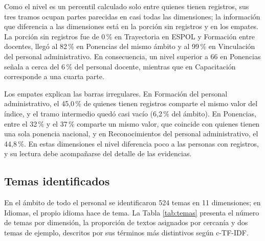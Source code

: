 Como el nivel es un percentil calculado solo entre quienes tienen registros, sus tres tramos ocupan partes parecidas en casi todas las dimensiones; la información que diferencia a las dimensiones está en la porción sin registros y en los empates. La porción sin registros fue de 0\,\% en Trayectoria en ESPOL y Formación entre docentes, llegó al 82\,\% en Ponencias del mismo ámbito y al 99\,\% en Vinculación del personal administrativo. En consecuencia, un nivel superior a 66 en Ponencias señala a cerca del 6\,\% del personal docente, mientras que en Capacitación corresponde a una cuarta parte.

Los empates explican las barras irregulares. En Formación del personal administrativo, el 45,0\,\% de quienes tienen registros comparte el mismo valor del índice, y el tramo intermedio quedó casi vacío (6,2\,\% del ámbito). En Ponencias, entre el 32\,\% y el 37\,\% comparte un mismo valor, que coincide con quienes tienen una sola ponencia nacional, y en Reconocimientos del personal administrativo, el 44,8\,\%. En estas dimensiones el nivel diferencia poco a las personas con registros, y su lectura debe acompañarse del detalle de las evidencias.

\subsection{Temas identificados}
\label{sec:res_temas}

En el ámbito de todo el personal se identificaron 524 temas en 11 dimensiones; en Idiomas, el propio idioma hace de tema. La Tabla \ref{tab:temas} presenta el número de temas por dimensión, la proporción de textos asignados por cercanía y dos temas de ejemplo, descritos por sus términos más distintivos según c-TF-IDF.

